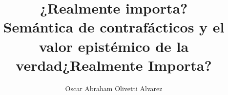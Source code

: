\documentclass[b5paper, 12pt, twoside, table, justified, 
nofonts, nobib, nohyper]{tufte-book}
\title{¿Realmente importa?\\  {\LARGE Semántica de contrafácticos y el valor epistémico de la verdad}}
\author[Oscar Abraham Olivetti Alvarez]{Oscar Abraham Olivetti Alvarez}
\begin{document}


\frontmatter
\maketitle

\title{¿Realmente Importa?} %


\setcounter{chapter}{-1}  %
\setcounter{secnumdepth}{3}
\setcounter{tocdepth}{3}


\begin{fullwidth}
	\tableofcontents
\end{fullwidth}






\mainmatter















\backmatter
\end{document}
